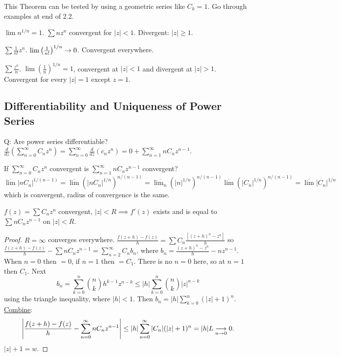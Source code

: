 \documentclass[]{article}
\begin{document}
This Theorem can be tested by using a geometric series like $C_k = 1$.
Go through examples at end of 2.2.

\begin{example}
	$\lim n^{1/n} = 1$. $\sum nz^n$ convergent for $|z|<1$. Divergent: $|z|\geq 1$.
\end{example}
\begin{example}
	$\sum\frac{1}{n!}z^n$. $\lim \left(\frac{1}{n!}\right)^{1/n} \rightarrow 0$. Convergent everywhere.
\end{example}
\begin{example}
	$\sum\frac{z^n}{n}$. $\lim\left(\frac{1}{n}\right)^{1/n} = 1$, convergent at $|z|<1$ and divergent at $|z|>1$. Convergent for every $|z|=1$ except $z=1$.
\end{example}

\subsection{Differentiability and Uniqueness of Power Series}

Q: Are power series differentiable? $\frac{d}{d z} \left( \sum_{n=0}^\infty C_nz^n \right) = \sum_{n=0}^\infty \frac{d}{d z} \left( c_n z^n \right) = 0+ \sum_{n=1}^\infty nC_n z^{n-1}$.

If $\sum_{n=0}^\infty C_n z^n $ convergent is $\sum_{n=1}^\infty n C_n z^{n-1}$ convergent?
$\overline{\lim}|nC_n|^{1/(n-1)} = \overline{\lim} \left( |nC_n|^{1/n} \right) ^{n/(n-1)} = \overline{\lim_n}\left(|n|^{1/n} \right)^{n/(n-1)} \overline{\lim} \left( |C_n|^{1/n} \right)^{n/(n-1)} = \overline{\lim} |C_n|^{1/n}$ which is convergent, radius of convergence is the same.

\begin{theorem}
	$f(z) = \sum C_n z^n$ convergent, $|z|<R \implies f'(z) $ exists and is equal to $\sum nC_n z^{n-1}$ on $|z|<R$.
\end{theorem}
\begin{proof}
	$R=\infty$ converges everywhere. $\frac{f(z+h)-f(z)}{h} = \sum C_n \frac{[(z+h)^n-z^n]}{h}$ so $\frac{f(z+h)-f(z)}{h} - \sum nC_n z^{n-1} = \sum_{n=2}^\infty C_n b_n$, where $b_n = \frac{(z+h)^n-z^n}{h}-nz^{n-1}$. When $n=0$ then $=0$, if $n=1$ then $=C_1$. There is no $n=0$ here, so at $n=1$ then $C_1$. Next $$b_n = \sum_{k=0}^n \binom{n}{k} h^{k-1} z^{n-k} \leq |h| \sum_{k=0}^n \binom{n}{k} |z|^{n-k}$$ using the triangle inequality, where $|h|<1$. Then $b_n = |h| \sum_{k=0}^n \left( | z | +1 \right)^n.$ \underline{Combine}: $$\left| \frac{f(z+h) - f(z)}{h} - \sum_{n=0}^\infty nC_nz^{n-1} \right| \leq |h| \sum_{n=0}^\infty |C_n| (|z| +1)^n  = |h| L \underset{n\rightarrow0}{\longrightarrow} 0. $$ $|z|+1=w$.
\end{proof}
\end{document}
